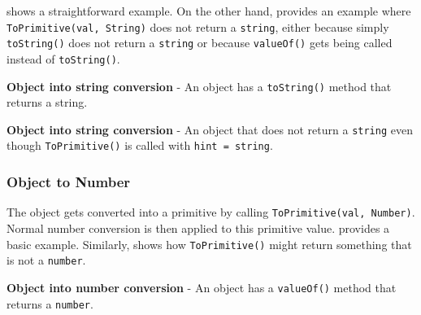  shows a straightforward example. On the other hand,  provides an example where \texttt{ToPrimitive(val, String)} does not return a \texttt{string}, either because simply \texttt{toString()} does not return a \texttt{string} or because \texttt{valueOf()} gets being called instead of \texttt{toString()}.

\begin{code}
	\captionsetup{aboveskip=0pt, belowskip=10pt}
	\caption[Object into string conversion]{\textbf{Object into string conversion} - An object has a \texttt{toString()} method that returns a string.}
	\label{code:background-object-into-string}
\end{code}

\begin{code}
	\captionsetup{aboveskip=0pt, belowskip=10pt}
	\caption[Object into string conversion]{\textbf{Object into string conversion} - An object that does not return a \texttt{string} even though \texttt{ToPrimitive()} is called with \texttt{hint = string}.}
	\label{code:background-object-into-string-not-string-return-value}
\end{code}

\subsubsection{Object to Number}
The object gets converted into a primitive by calling \texttt{ToPrimitive(val, Number)}. Normal number conversion is then applied to this primitive value.  provides a basic example. Similarly,  shows how \texttt{ToPrimitive()} might return something that is not a \texttt{number}.

\begin{code}
	\captionsetup{aboveskip=0pt, belowskip=10pt}
	\caption[Object into number conversion]{\textbf{Object into number conversion} - An object has a \texttt{valueOf()} method that returns a \texttt{number}.}
	\label{code:background-object-into-number}
\end{code}


